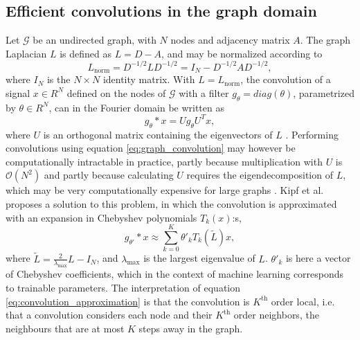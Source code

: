 \subsection{Efficient convolutions in the graph domain}

Let $\mathcal{G}$ be an undirected graph, with $N$ nodes and adjacency matrix $A$. The graph Laplacian $L$ is defined as $L=D-A$, and may be normalized according to
\begin{equation}
    L_\text{norm} = D^{-1/2} L D^{-1/2} =  I_N - D^{-1/2} A D^{-1/2},
    \label{eq:normalized_graph_laplacian}
\end{equation}
where $I_N$ is the $N \times N$ identity matrix. With $L = L_{\text{norm}}$, the convolution of a signal $x \in R^N$ defined on the nodes of $\mathcal{G}$ with a filter $g_\theta = diag(\theta)$, parametrized by $\theta \in R^N$, can in the Fourier domain be written as
\begin{equation}
    g_\theta * x = U g_\theta U^T x,
    \label{eq:graph_convolution}
\end{equation}
where $U$ is an orthogonal matrix containing the eigenvectors of $L$ \cite{kipf_semi_supervised}. Performing convolutions using equation \ref{eq:graph_convolution} may however be computationally intractable in practice, partly because multiplication with $U$ is $\mathcal{O}(N^2)$ and partly because calculating $U$ requires the eigendecomposition of $L$, which may be very computationally expensive for large graphs \cite{kipf_semi_supervised}. Kipf et al. \cite{kipf_semi_supervised} proposes a solution to this problem, in which the convolution is approximated with an expansion in Chebyshev polynomials $T_k(x)$:s,
\begin{equation}
    g_{\theta'} * x \approx \sum_{k=0}^K \theta'_k T_k(\tilde{L})x,
    \label{eq:convolution_approximation}
\end{equation}
where $\tilde{L} =  \frac{2}{\lambda_{\text{max}}}L - I_N$, and $\lambda_{\text{max}}$ is the largest eigenvalue of $L$. $\theta'_k$ is here a vector of Chebyshev coefficients, which in the context of machine learning corresponds to trainable parameters. The interpretation of equation \eqref{eq:convolution_approximation} is that the convolution is $K^{\text{th}}$ order local, i.e. that a convolution considers each node and their $K^{\text{th}}$ order neighbors, the neighbours that are at most $K$ steps away in the graph. 

